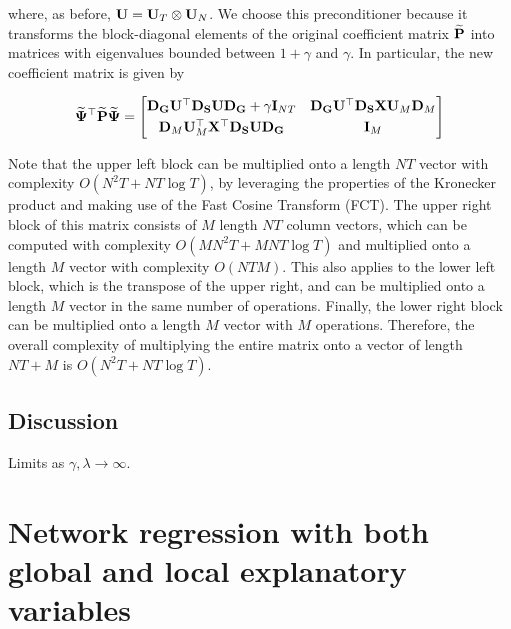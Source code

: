 where, as before, $\mathbf{U} = \mathbf{U}_T \otimes \mathbf{U}_N $. We choose this preconditioner because it transforms the block-diagonal elements of the original coefficient matrix $\widetilde{\mathbf{P}}$ into matrices with eigenvalues bounded between $1 + \gamma$ and $\gamma$. In particular, the new coefficient matrix is given by

\begin{equation*}
    \widetilde{\mathbf{\Psi}}^\top \widetilde{\mathbf{P}}  \widetilde{\mathbf{\Psi}} = 
       \begin{bmatrix}
        \mathbf{D}_{\mathbf{G}} \mathbf{U}^\top \mathbf{D}_{\mathbf{S}} \mathbf{U} \mathbf{D}_{\mathbf{G}} + \gamma \mathbf{I}_{NT}  &  \mathbf{D}_{\mathbf{G}} \mathbf{U}^\top \mathbf{D}_{\mathbf{S}} \mathbf{X} \mathbf{U}_M \mathbf{D}_M \\[0.1cm] 
        \mathbf{D}_M \mathbf{U}_M^\top \mathbf{X}^\top \mathbf{D}_{\mathbf{S}} \mathbf{U} \mathbf{D}_{\mathbf{G}} & \mathbf{I}_M
        \end{bmatrix}
\end{equation*}

Note that the upper left block can be multiplied onto a length $NT$ vector with complexity $O(N^2T + NT \log T)$, by leveraging the properties of the Kronecker product and making use of the Fast Cosine Transform (FCT). The upper right block of this matrix consists of $M$ length $NT$ column vectors, which can be computed with complexity $O(MN^2T + MNT \log T)$ and multiplied onto a length $M$ vector with complexity $O(NTM)$. This also applies to the lower left block, which is the transpose of the upper right, and can be multiplied onto a length $M$ vector in the same number of operations. Finally, the lower right block can be multiplied onto a length $M$ vector with $M$ operations. Therefore, the overall complexity of multiplying the entire matrix onto a vector of length $NT + M$ is $O(N^2T + NT \log T)$. 

\subsection{Discussion}

Limits as $\gamma, \lambda \rightarrow \infty$. 

\subsection{}




\section{Network regression with both global and local explanatory variables}

